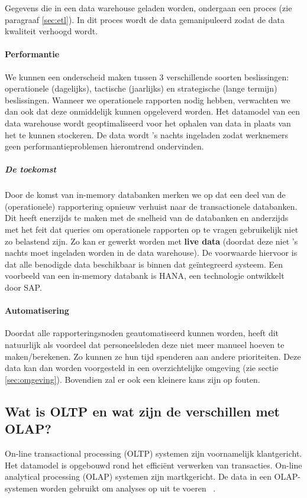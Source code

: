 Gegevens die in een data warehouse geladen worden, ondergaan een proces (zie paragraaf \ref{sec:etl}). In dit proces wordt de data gemanipuleerd zodat de data kwaliteit verhoogd wordt.

\paragraph{Performantie}
We kunnen een onderscheid maken tussen 3 verschillende soorten beslissingen: operationele (dagelijks), tactische (jaarlijks) en strategische (lange termijn) beslissingen. Wanneer we operationele rapporten nodig hebben, verwachten we dan ook dat deze onmiddelijk kunnen opgeleverd worden. Het datamodel van een data warehouse wordt geoptimaliseerd voor het ophalen van data in plaats van het te kunnen stockeren. De data wordt 's nachts ingeladen zodat werknemers geen performantieproblemen hieromtrend ondervinden. 

\subparagraph{De toekomst}
Door de komst van in-memory databanken merken we op dat een deel van de (operationele) rapportering opnieuw verhuist naar de transactionele databanken. Dit heeft enerzijds te maken met de snelheid van de databanken en anderzijds met het feit dat queries om operationele rapporten op te vragen gebruikelijk niet zo belastend zijn. Zo kan er gewerkt worden met \textbf{live data} (doordat deze niet 's nachts moet ingeladen worden in de data warehouse). De voorwaarde hiervoor is dat alle benodigde data beschikbaar is binnen dat geïntegreerd systeem. Een voorbeeld van een in-memory databank is HANA, een technologie ontwikkelt door SAP.

\paragraph{Automatisering}
Doordat alle rapporteringsnoden geautomatiseerd kunnen worden, heeft dit natuurlijk als voordeel dat personeelsleden deze niet meer manueel hoeven te maken/berekenen. Zo kunnen ze hun tijd spenderen aan andere prioriteiten. Deze data kan dan worden voorgesteld in een overzichtelijke omgeving (zie sectie \ref{sec:omgeving}). Bovendien zal er ook een kleinere kans zijn op fouten.

\subsection{Wat is OLTP en wat zijn de verschillen met OLAP?}
\label{sec:oltp-vs-olap}
On-line transactional processing (OLTP) systemen zijn voornamelijk klantgericht. Het datamodel is opgebouwd rond het efficiënt verwerken van transacties. On-line analytical processing (OLAP) systemen zijn martkgericht. De data in een OLAP-systemen worden gebruikt om analyses op uit te voeren ~\autocite{Satyanarayana2010}.


